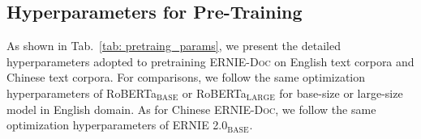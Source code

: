 \documentclass[11pt,a4paper]{article}
\newcommand{\mname}{\textsc{ERNIE-Doc}\xspace}
\begin{document}
\subsection{Hyperparameters for Pre-Training}
As shown in Tab.~\ref{tab: pretraing_params}, we present the detailed hyperparameters adopted to pretraining \mname on English text corpora and Chinese text corpora. For comparisons, we follow the same optimization hyperparameters of RoBERTa$_\text{BASE}$ or RoBERTa$_\text{LARGE}$ \citep{liu2019roberta} for base-size or large-size model in English domain. As for Chinese \mname, we follow the same optimization hyperparameters of ERNIE 2.0$_\text{BASE}$. 

\begin{table}[!h]
\caption{Hyperparameters used for \mname pretraining.}
\label{tab: pretraing_params}
\vspace{-0.5cm}
\end{table}
\end{document}

